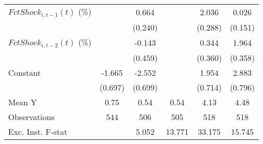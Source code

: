 {\begin{tabular}{l*{5}{c}}
\addlinespace
$ FctShock_{i,t-1}(t)$ (\%)&                     &       0.664\sym{***}&                     &       2.036\sym{***}&       0.026         \\
                    &                     &     (0.240)         &                     &     (0.288)         &     (0.151)         \\
\addlinespace
$ FctShock_{i,t-2}(t)$ (\%)&                     &      -0.143         &                     &       0.344         &       1.964\sym{***}\\
                    &                     &     (0.459)         &                     &     (0.360)         &     (0.358)         \\
\addlinespace
Constant            &      -1.665\sym{**} &      -2.552\sym{***}&                     &       1.954\sym{***}&       2.883\sym{***}\\
                    &     (0.697)         &     (0.699)         &                     &     (0.714)         &     (0.796)         \\
\midrule
Mean Y              &        0.75         &        0.54         &        0.54         &        4.13         &        4.48         \\
Observations        &         544         &         506         &         505         &         518         &         518         \\
Exc. Inst. F-stat   &                     &       5.052         &      13.771         &      33.175         &      15.745         \\
\bottomrule
\end{tabular}
}
